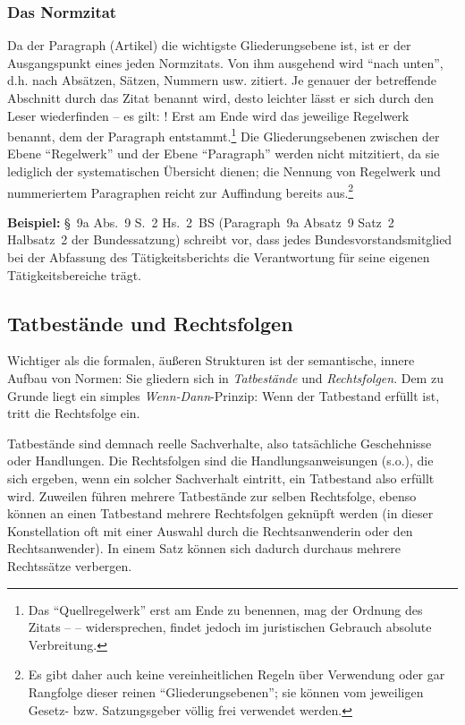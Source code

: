 \subsubsection{Das Normzitat}
Da der Paragraph (Artikel) die wichtigste Gliederungsebene ist, ist er der Ausgangspunkt eines jeden Normzitats.
Von ihm ausgehend wird \enquote{nach unten}, d.h. nach Absätzen, Sätzen, Nummern usw. zitiert.
Je genauer der betreffende Abschnitt durch das Zitat benannt wird, desto leichter lässt er sich durch den Leser wiederfinden – es gilt: !
Erst am Ende wird das jeweilige Regelwerk benannt, dem der Paragraph entstammt.\footnote{Das \enquote{Quellregelwerk} erst am Ende zu benennen, mag der Ordnung des Zitats –  – widersprechen, findet jedoch im juristischen Gebrauch absolute Verbreitung.}
Die Gliederungsebenen zwischen der Ebene \enquote{Regelwerk} und der Ebene \enquote{Paragraph} werden nicht mitzitiert, da sie lediglich der systematischen Übersicht dienen; die Nennung von Regelwerk und nummeriertem Paragraphen reicht zur Auffindung bereits aus.\footnote{Es gibt daher auch keine vereinheitlichen Regeln über Verwendung oder gar Rangfolge dieser reinen \enquote{Gliederungsebenen}; sie können vom jeweiligen Gesetz- bzw. Satzungsgeber völlig frei verwendet werden.}

\textbf{Beispiel:} \S~9a Abs.~9 S.~2 Hs.~2~BS (Paragraph~9a Absatz~9 Satz~2 Halbsatz~2 der Bundessatzung) schreibt vor, dass jedes Bundesvorstandsmitglied bei der Abfassung des Tätigkeitsberichts die Verantwortung für seine eigenen Tätigkeitsbereiche trägt. 

\subsection{Tatbestände und Rechtsfolgen}
Wichtiger als die formalen, äußeren Strukturen ist der semantische, innere Aufbau von Normen:
Sie gliedern sich in \emph{Tatbestände} und \emph{Rechtsfolgen}.
Dem zu Grunde liegt ein simples \emph{Wenn-Dann}-Prinzip:
Wenn der Tatbestand erfüllt ist, tritt die Rechtsfolge ein.

Tatbestände sind demnach reelle Sachverhalte, also tatsächliche Geschehnisse oder Handlungen.
Die Rechtsfolgen sind die Handlungsanweisungen (s.o.), die sich ergeben, wenn ein solcher Sachverhalt eintritt, ein Tatbestand also erfüllt wird.
Zuweilen führen mehrere Tatbestände zur selben Rechtsfolge, ebenso können an einen Tatbestand mehrere Rechtsfolgen geknüpft werden (in dieser Konstellation oft mit einer Auswahl durch die Rechtsanwenderin oder den Rechtsanwender).
In einem Satz können sich dadurch durchaus mehrere Rechtssätze verbergen.


